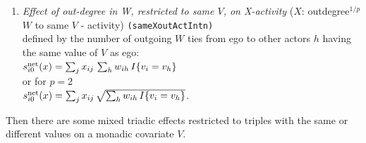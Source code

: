 \documentclass[a4paper,fleqn,11pt]{article}
\newcommand{\+}{\, + \,}
\newcommand{\vit}{\theenumi}
\newcounter{savenumi}
\begin{document}
\begin{enumerate}
 \item {\em Effect of out-degree in W, restricted to same $V$, on X-activity }
 ($X$: outdegree$^{1/p}$ $W$ to same $V$ - activity) \texttt{(sameXoutActIntn)}\\
 defined by the number of outgoing $W$ ties from ego to other actors $h$
 having the same value of $V$ as ego:\\
 $s^{\rm net}_{i\vit}(x) =  \sum_j x_{ij}\, \sum_h w_{ih}\,I\{v_i = v_h\}  $ \\
 or for $p=2$ \\
   $s^{\rm net}_{i\vit}(x) =  \sum_j x_{ij}\, \sqrt{\sum_h w_{ih}\,I\{v_i = v_h\}}   $.
\setcounter{savenumi}{\value{enumi}}
\end{enumerate}

\noindent
Then there are some  mixed triadic effects
restricted to triples with the same or different values on a monadic
covariate $V$.
\end{document}
